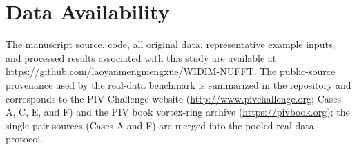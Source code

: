 \documentclass[lettersize,journal]{IEEEtran}
\begin{document}
\section*{Data Availability}

The manuscript source, code, all original data, representative example inputs, and processed results associated with this study are available at \url{https://github.com/laoyanmengmengxue/WIDIM-NUFFT}. The public-source provenance used by the real-data benchmark is summarized in the repository and corresponds to the PIV Challenge website (\url{http://www.pivchallenge.org}; Cases A, C, E, and F) and the PIV book vortex-ring archive (\url{https://pivbook.org}); the single-pair sources (Cases A and F) are merged into the pooled real-data protocol.



\end{document}
